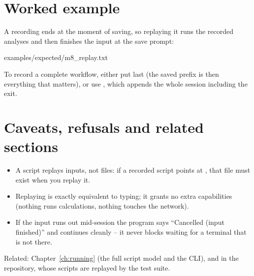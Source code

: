 \section{Worked example}

A recording ends at the moment of saving, so replaying it runs the recorded
analyses and then finishes the input at the save prompt:


  {examples/expected/m8_replay.txt}

To record a complete workflow, either put  last (the saved prefix is
then everything that matters), or use , which appends the
whole session including the exit.

\section{Caveats, refusals and related sections}

\begin{refusalbox}
\begin{itemize}
  \item A script replays inputs, not files: if a recorded script points at
    , that file must exist when you replay it.
  \item Replaying is exactly equivalent to typing; it grants no extra
    capabilities (nothing runs calculations, nothing touches the network).
  \item If the input runs out mid-session the program says
    ``Cancelled (input finished)'' and continues cleanly -- it never blocks
    waiting for a terminal that is not there.
\end{itemize}
\end{refusalbox}

Related: Chapter~\ref{ch:running} (the full script model and the CLI), and
 in the repository, whose scripts are replayed by
the test suite.

